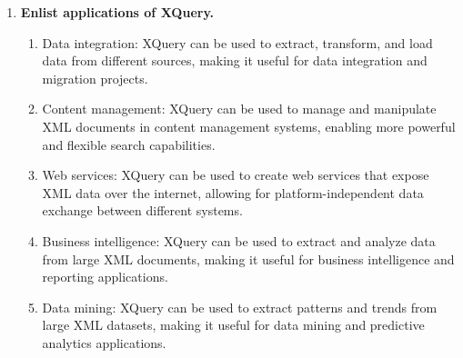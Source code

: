 \documentclass[11pt]{article}
\begin{document}
\begin{enumerate}
    \item \textbf{Enlist applications of XQuery.}\\
          \begin{enumerate}
              \item Data integration: XQuery can be used to extract, transform, and load data from different sources, making it useful for data integration and migration projects.
              \item Content management: XQuery can be used to manage and manipulate XML documents in content management systems, enabling more powerful and flexible search capabilities.
              \item Web services: XQuery can be used to create web services that expose XML data over the internet, allowing for platform-independent data exchange between different systems.
              \item Business intelligence: XQuery can be used to extract and analyze data from large XML documents, making it useful for business intelligence and reporting applications.
              \item Data mining: XQuery can be used to extract patterns and trends from large XML datasets, making it useful for data mining and predictive analytics applications.
          \end{enumerate}

\end{enumerate}
\end{document}
